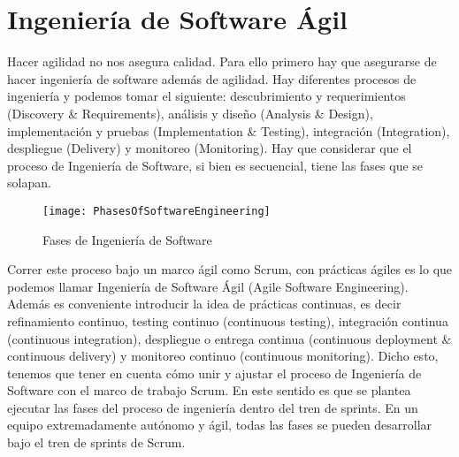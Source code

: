 \chapter{Ingeniería de Software Ágil}

Hacer agilidad no nos asegura calidad. Para ello primero hay que asegurarse de hacer ingeniería de software además de agilidad. Hay diferentes procesos de ingeniería y podemos tomar el siguiente: descubrimiento y requerimientos (Discovery \& Requirements), análisis y diseño (Analysis \& Design), implementación y pruebas (Implementation \& Testing), integración (Integration), despliegue (Delivery) y monitoreo (Monitoring). Hay que considerar que el proceso de Ingeniería de Software, si bien es secuencial, tiene las fases que se solapan. 

\begin{figure}[h]
  \centering
  \texttt{[image: PhasesOfSoftwareEngineering]}
  \caption{Fases de Ingeniería de Software}
  \centering
  \label{fig:PhasesOfSoftwareEngineering} %
\end{figure}

Correr este proceso bajo un marco ágil como Scrum, con prácticas ágiles es lo que podemos llamar Ingeniería de Software Ágil (Agile Software Engineering). Además es conveniente introducir la idea de prácticas continuas, es decir refinamiento continuo, testing continuo (continuous testing), integración continua (continuous integration), despliegue o entrega continua (continuous deployment \& continuous delivery) y monitoreo continuo (continuous monitoring). 
Dicho esto, tenemos que tener en cuenta cómo unir y ajustar el proceso de Ingeniería de Software con el marco de trabajo Scrum. En este sentido es que se plantea ejecutar las fases del proceso de ingeniería dentro del tren de sprints. En un equipo extremadamente autónomo y ágil, todas las fases se pueden desarrollar bajo el tren de sprints de Scrum.

